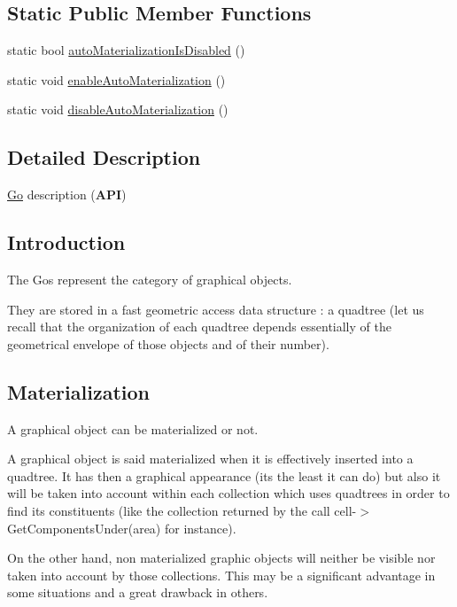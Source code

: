 \subsection*{Static Public Member Functions}
\begin{DoxyCompactItemize}
\item 
static bool \hyperlink{classHurricane_1_1Go_a1057be4198a7b64c32a2ac3c7d560014}{auto\+Materialization\+Is\+Disabled} ()
\item 
static void \hyperlink{classHurricane_1_1Go_ab0b1ca3c606247e1ebd7cab8fa828b04}{enable\+Auto\+Materialization} ()
\item 
static void \hyperlink{classHurricane_1_1Go_a0d49d22a3788e8001e58152e62b9f3cc}{disable\+Auto\+Materialization} ()
\end{DoxyCompactItemize}


\subsection{Detailed Description}
\hyperlink{classHurricane_1_1Go}{Go} description ({\bfseries A\+PI}) 

\hypertarget{classHurricane_1_1Go_secGoIntro}{}\subsection{Introduction}\label{classHurricane_1_1Go_secGoIntro}
The Gos represent the category of graphical objects.

They are stored in a fast geometric access data structure \+: a quadtree (let us recall that the organization of each quadtree depends essentially of the geometrical envelope of those objects and of their number).\hypertarget{classHurricane_1_1Go_secGoMaterialization}{}\subsection{Materialization}\label{classHurricane_1_1Go_secGoMaterialization}
A graphical object can be materialized or not.

A graphical object is said materialized when it is effectively inserted into a quadtree. It has then a graphical appearance (it\textquotesingle{}s the least it can do) but also it will be taken into account within each collection which uses quadtrees in order to find its constituents (like the collection returned by the call cell-\/$>$Get\+Components\+Under(area) for instance).

On the other hand, non materialized graphic objects will neither be visible nor taken into account by those collections. This may be a significant advantage in some situations and a great drawback in others.

